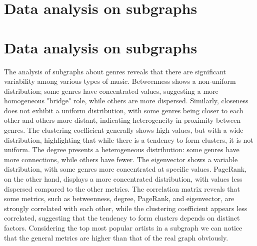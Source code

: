 \section{Data analysis on subgraphs}
\section{Data analysis on subgraphs}
The analysis of subgraphs about genres reveals that there are significant variability among various types of music. 
Betweenness shows a non-uniform distribution; some genres have concentrated values, suggesting a more homogeneous "bridge" role, while others are more dispersed. 
Similarly, closeness does not exhibit a uniform distribution, with some genres being closer to each other and others more distant, indicating heterogeneity in proximity between genres. 
The clustering coefficient generally shows high values, but with a wide distribution, highlighting that while there is a tendency to form clusters, it is not uniform. The degree presents a heterogeneous distribution: some genres have more connections, while others have fewer. 
The eigenvector shows a variable distribution, with some genres more concentrated at specific values. PageRank, on the other hand, displays a more concentrated distribution, with values less dispersed compared to the other metrics. 
The correlation matrix reveals that some metrics, such as betweenness, degree, PageRank, and eigenvector, are strongly correlated with each other, while the clustering coefficient appears less correlated, suggesting that the tendency to form clusters depends on distinct factors.
Considering the top most popular artists in a subgraph we can notice that the general metrics are higher than that of the real graph obviously.
